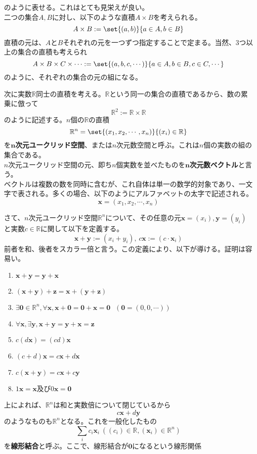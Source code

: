 \documentclass[dvipdfmx]{jsarticle}
\begin{document}
のように表せる。これはとても見栄えが良い。\\
\build 二つの集合$A,B$に対し、以下のような直積$A \times B$を考えられる。
\[A \times B := \set{(a,b)}{a \in A, b \in B}\]
直積の元は、$A$と$B$それぞれの元を一つずつ指定することで定まる。当然、3つ以上の集合の直積も考えられ
\[A \times B \times C \times \cdots := \set{(a,b,c,\cdots)}{a \in A, b \in B, c \in C, \cdots}\]
のように、それぞれの集合の元の組になる。\par
次に実数$\mathbb{R}$同士の直積を考える。$\mathbb{R}$という同一の集合の直積であるから、数の累乗に倣って
\[\mathbb{R}^2:=\mathbb{R} \times \mathbb{R}\]
のように記述する。$n$個の$\mathbb{R}$の直積
\[\mathbb{R}^n = \set{(x_1,x_2,\cdots,x_n)}{(x_i) \in \mathbb{R}}\]
を$\bm{n}$\textbf{次元ユークリッド空間}、または$n$次元数空間と呼ぶ。これは$n$個の実数の組の集合である。\\
$n$次元ユークリッド空間の元、即ち$n$個実数を並べたものを$\bm{n}$\textbf{次元数ベクトル}と言う。\\
ベクトルは複数の数を同時に含むが、これ自体は単一の数学的対象であり、一文字で表される。多くの場合、以下のようにアルファベットの太字で記述される。
\[\bm{x}=(x_1,x_2,\cdots,x_n)\]\par
さて、$n$次元ユークリッド空間$\mathbb{R}^n$について、その任意の元$\bm{x}=(x_i),\bm{y}=(y_i)$と実数$c\in\mathbb{R}$に関して以下を定義する。
\[\bm{x}+\bm{y}:=(x_i+y_i),~c\bm{x}:=(c\cdot\bm{x}_i)\]
前者を和、後者をスカラー倍と言う。この定義により、以下が導ける。証明は容易い。
\begin{enumerate}
\item $\bm{x}+\bm{y}=\bm{y}+\bm{x}$
\item $(\bm{x}+\bm{y})+\bm{z}=\bm{x}+(\bm{y}+\bm{z})$
\item $\exists\bm{0}\in\mathbb{R}^n,\forall\bm{x},\bm{x}+\bm{0}=\bm{0}+\bm{x}=\bm{0}~~~(\bm{0}=(0,0,\cdots))$
\item $\forall\bm{x},\exists\bm{y},\bm{x}+\bm{y}=\bm{y}+\bm{x}=\bm{z}$
\item $c(d\bm{x})=(cd)\bm{x}$
\item $(c+d)\bm{x}=c\bm{x}+d\bm{x}$
\item $c(\bm{x}+\bm{y})=c\bm{x}+c\bm{y}$
\item $1\bm{x}=\bm{x}$及び$0\bm{x}=\bm{0}$
\end{enumerate}
上によれば、$\mathbb{R}^n$は和と実数倍について閉じているから
\[c\bm{x}+d\bm{y}\]
のようなものも$\mathbb{R}^n$となる。これを一般化したもの
\[\sum_ic_i\bm{x}_i~((c_i)\in\mathbb{R},(\bm{x}_i)\in\mathbb{R}^n)\]
を\textbf{線形結合}と呼ぶ。ここで、線形結合が$\bm{0}$になるという線形関係
\end{document}
